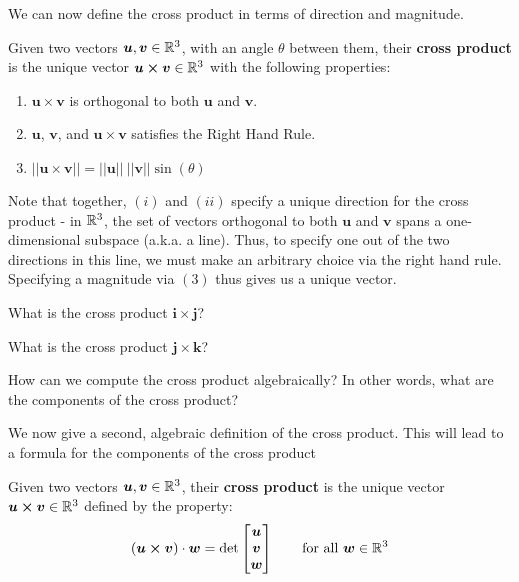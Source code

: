 We can now define the cross product in terms of direction and magnitude.

\begin{definition}
    Given two vectors $\bm{u}, \bm{v} \in \mathbb{R}^3$, with an angle $\theta$ between them, their \textbf{cross product} is the \textnormal{unique} vector $\bm{u \times v} \in \mathbb{R}^3$ with the following properties:
    \begin{enumerate}[label=(\roman*)]
        \item $\bm{u \times v}$ is orthogonal to both $\bm{u}$ and $\bm{v}$.
        \item $\bm{u}$, $\bm{v}$, and $\bm{u \times v}$ satisfies the Right Hand Rule. 
        \item $||\bm{u \times v}|| = ||\bm{u}|| \ ||\bm{v}|| \sin(\theta)$
    \end{enumerate}
    \end{definition}



Note that together, $(i)$ and $(ii)$ specify a unique direction for the cross product - in $\mathbb{R}^3$, the set of vectors orthogonal to both $\bm{u}$ and $\bm{v}$ spans a one-dimensional subspace (a.k.a. a line).  Thus, to specify one out of the two directions in this line, we must make an arbitrary choice via the right hand rule.  Specifying a magnitude via $(3)$ thus gives us a unique vector.  

\begin{example}
    What is the cross product $\bm{i} \times \bm{j}$?
\end{example}

\begin{example}
    What is the cross product $\bm{j} \times \bm{k}$?
\end{example}

\begin{motivating}
How can we compute the cross product algebraically?  In other words, what are the components of the cross product?
\end{motivating}

We now give a second, algebraic definition of the cross product.  This will lead to a formula for the components of the cross product 


\begin{definition}
    Given two vectors $\bm{u}, \bm{v} \in \mathbb{R}^3$, their \textbf{cross product} is the \textnormal{unique} vector $\bm{u \times v} \in \mathbb{R}^3$ defined by the property:
    \begin{equation*}
(\bm{u \times v}) \cdot \bm{w} = \textnormal{det}
\begin{bmatrix}
\bm{u}\\
    \bm{v}  \\
    \bm{w}
\end{bmatrix} \qquad \textnormal{for all } \bm{w} \in \mathbb{R}^3
\end{equation*}
    
    \end{definition}


